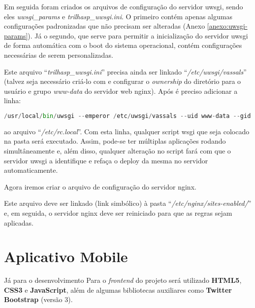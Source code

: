Em seguida foram criados os arquivos de configuração do servidor \gls{uwsgi}, sendo eles \textit{uwsgi\_params} e \textit{trilhasp\_uwsgi.ini}.
O primeiro contém apenas algumas configurações padronizadas que não precisam ser alteradas (Anexo \ref{anexo:uwsgi-params}). Já o segundo, que serve para permitir a inicialização do servidor \gls{uwsgi} de forma automática com o boot do sistema operacional, contém configurações necessárias de serem personalizadas.


Este arquivo ``\textit{trilhasp\_uwsgi.ini}''  precisa ainda ser linkado ``\textit{/etc/uwsgi/vassals}'' (talvez seja necessário criá-lo com e configurar o \textit{ownership} do diretório para o usuário e grupo \textit{www-data} do servidor web \gls{nginx}). Após é preciso adicionar a linha:
\begin{lstlisting}[language={Python},caption={Inicialização automática do servidor uWSGI}]
/usr/local/bin/uwsgi --emperor /etc/uwsgi/vassals --uid www-data --gid www-data
\end{lstlisting}
ao arquivo ``\textit{/etc/rc.local}''. Com esta linha, qualquer script wsgi que seja colocado na pasta será executado. Assim, pode-se ter múltiplas aplicações rodando simultâneamente e, além disso, qualquer alteração no script fará com que o servidor \gls{uwsgi} a identifique e refaça o deploy da mesma no servidor automaticamente.

Agora iremos criar o arquivo de configuração do servidor nginx.


Este arquivo deve ser linkado (link simbólico) à pasta ``\textit{/etc/nginx/sites-enabled/}'' e, em seguida, o servidor \gls{nginx} deve ser reiniciado para que as regras sejam aplicadas.

\section{Aplicativo Mobile}\label{sec:spec-appmobile}

Já para o desenvolvimento Para o \textit{frontend} do projeto será utilizado \textbf{HTML5}, \textbf{CSS3} e \textbf{JavaScript}, além de algumas bibliotecas auxiliares como \textbf{Twitter Bootstrap} (versão 3).



